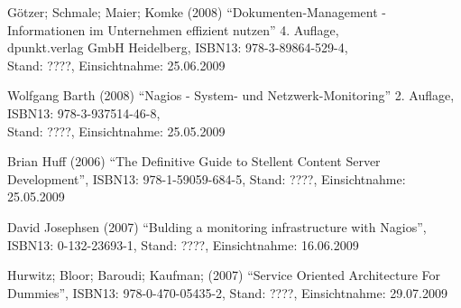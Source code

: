 \documentclass[12pt, a4paper, headsepline]{article}
\renewcommand{\refname}{Quellenverzeichnis}
\begin{document}
\renewcommand{\refname}{Quellverzeichnis} 


\begin{thebibliography}{xxxxxxxx}

	 Götzer; Schmale; Maier; Komke (2008) "`Dokumenten-Management - Informationen im Unternehmen effizient nutzen"' 4. Auflage,\\
	 dpunkt.verlag GmbH Heidelberg,  
	 ISBN13: 978-3-89864-529-4,\\
	 Stand: ????, Einsichtnahme: 25.06.2009

	 Wolfgang Barth (2008) "`Nagios - System- und Netzwerk-Monitoring"' 2. Auflage, \\
	 ISBN13: 978-3-937514-46-8, \\
	 Stand: ????, Einsichtnahme: 25.05.2009
	 
	 Brian Huff (2006) "`The Definitive Guide to Stellent Content Server Development"', \newline ISBN13: 978-1-59059-684-5, \newline Stand: ????, Einsichtnahme: 25.05.2009

	 David Josephsen (2007) "`Bulding a monitoring infrastructure with Nagios"', \newline ISBN13: 0-132-23693-1, \newline Stand: ????, Einsichtnahme: 16.06.2009

	 Hurwitz; Bloor; Baroudi; Kaufman; (2007) "`Service Oriented Architecture For Dummies"', \newline ISBN13: 978-0-470-05435-2, \newline Stand: ????, Einsichtnahme: 29.07.2009
	 

\end{thebibliography}
\end{document}
